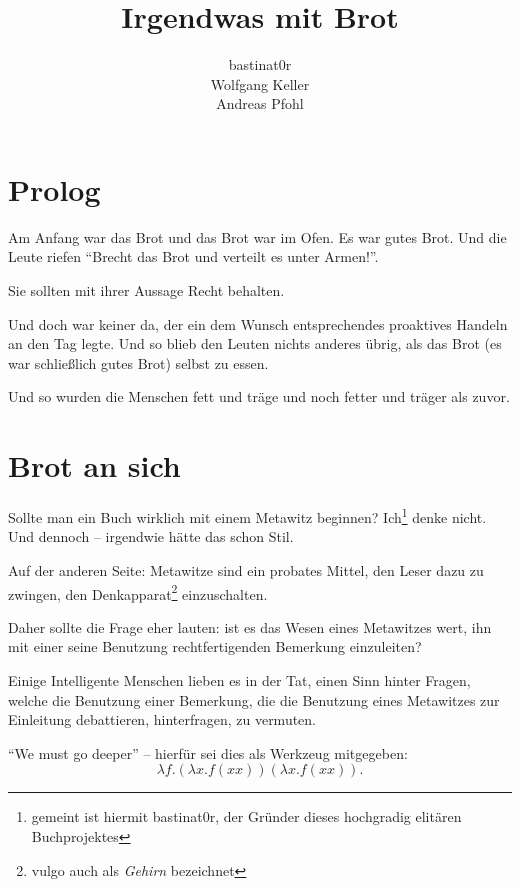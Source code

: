 \documentclass{scrbook}
\title{Irgendwas mit Brot}
\author{bastinat0r \\ Wolfgang Keller \\ Andreas Pfohl}
\begin{document}
\maketitle

\chapter*{Prolog}

Am Anfang war das Brot und das Brot war im Ofen. Es war gutes Brot. Und die Leute riefen "`Brecht das Brot und verteilt es unter Armen!"'.

Sie sollten mit ihrer Aussage Recht behalten. %

Und doch war keiner da, der ein dem Wunsch entsprechendes proaktives Handeln an den Tag legte. Und so blieb den Leuten nichts anderes übrig, als das Brot (es war schließlich gutes Brot) selbst zu essen.

Und so wurden die Menschen fett und träge und noch fetter und träger als zuvor.

\chapter{Brot an sich}

Sollte man ein Buch wirklich mit einem Metawitz beginnen? Ich\footnote{gemeint ist hiermit bastinat0r, der Gründer dieses hochgradig elitären Buchprojektes} denke nicht. Und dennoch – irgendwie hätte das schon Stil.

Auf der anderen Seite: Metawitze sind ein probates Mittel, den Leser dazu zu zwingen, den Denkapparat\footnote{vulgo auch als \emph{Gehirn} bezeichnet} einzuschalten.

Daher sollte die Frage eher lauten: ist es das Wesen eines Metawitzes wert, ihn mit einer seine Benutzung rechtfertigenden Bemerkung einzuleiten?

Einige Intelligente Menschen lieben es in der Tat, einen Sinn hinter Fragen, welche die Benutzung einer Bemerkung, die die Benutzung eines Metawitzes zur Einleitung debattieren, hinterfragen, zu vermuten.

"`We must go deeper"' -- hierfür sei dies als Werkzeug mitgegeben:
\begin{displaymath}
\lambda f.(\lambda x.f (x x)) (\lambda x.f (x x)).
\end{displaymath}
%
\end{document}
